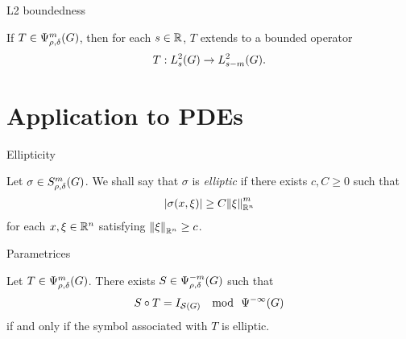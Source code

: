 \documentclass{beamer}
\begin{document}
\begin{frame}
    {L2 boundedness}

    \begin{theorem}
        If $T \in \OperatorClass m {\rho, \delta}$,
        then for each $s \in \R$,
        $T$ extends to a bounded operator
        \begin{align*}
            T : \Sobolev s \to \Sobolev {s - m}.
        \end{align*}
    \end{theorem}
\end{frame}

\section{Application to PDEs}

\begin{frame}
    {Ellipticity}

    \begin{definition}
        [Ellipticity]

        Let $\sigma \in \SymbolClass m {\rho, \delta}$.
        We shall say that $\sigma$ is \emph{elliptic} if there exists $c, C \geq 0$ such that
        \begin{align*}
            \abs {\sigma(x, \xi)}
            \geq C \norm [\R^n] \xi^m
        \end{align*}
        for each $x, \xi \in \R^n$ satisfying $\norm [\R^n] \xi \geq c$.
    \end{definition}
\end{frame}

\begin{frame}
    {Parametrices}

    \begin{theorem}

        Let $T \in \OperatorClass m {\rho, \delta}$.
        There exists $S \in \OperatorClass {-m} {\rho, \delta}$ such that
        \begin{align*}
            S \circ T = \Id {\Schwartz \Group}
            \quad
            \text{mod } \
            \SmoothingOperators
        \end{align*}
        if and only if the symbol associated with $T$ is elliptic.
    \end{theorem}
\end{frame}
\end{document}

